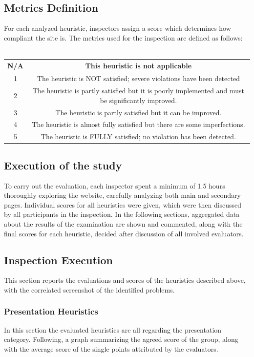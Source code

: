 \documentclass[11pt]{article} %
\begin{document}
\subsection{Metrics Definition}
For each analyzed heuristic, inspectors assign a score which determines how compliant the site is.
The metrics used for the inspection are defined as follows:\\ \\
\begin{center}
    \begin{tabular}{ |c|c| } 
    \hline
    N/A & This heuristic is not applicable \\ 
    \hline
    1 & The heuristic is NOT satisfied; severe violations have been detected \\ 
    \hline
    2 & The heuristic is partly satisfied but it is poorly implemented and must be significantly improved. \\ 
    \hline
    3 & The heuristic is partly satisfied but it can be improved.\\
    \hline
    4 & The heuristic is almost fully satisfied but there are some imperfections. \\
    \hline
    5 & The heuristic is FULLY satisfied; no violation has been detected. \\
    \hline
    \end{tabular}
\end{center}

\subsection{Execution of the study}
To carry out the evaluation, each inspector spent a minimum of 1.5 hours thoroughly exploring the website, carefully analyzing both main and secondary pages. Individual scores for all heuristics were given, which were then discussed by all participants in the inspection. In the following sections, aggregated data about the results of the examination are shown and commented, along with the final scores for each heuristic, decided after discussion of all involved evaluators. 

\subsection{Inspection Execution}
This section reports the evaluations and scores of the heuristics described above, with the correlated screenshot of the identified problems.
\subsubsection{Presentation Heuristics}
In this section the evaluated heuristics are all regarding the presentation category. Following, a graph summarizing the agreed score of the group, along with the average score of the single points attributed by the evaluators.
\end{document}
